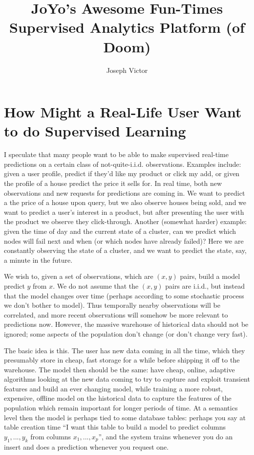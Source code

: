 \documentclass[a4paper,12pt]{article}
\author{Joseph Victor}
\title{JoYo's Awesome Fun-Times Supervised Analytics Platform (of Doom)}
\begin{document}
\maketitle

\section*{How Might a Real-Life User Want to do Supervised Learning}

I speculate that many people want to be able to make supervised real-time predictions on a certain class of not-quite-i.i.d. observations.  
Examples include: given a user profile, predict if they'd like my product or click my add, or given the profile of a house predict the price it sells for.
In real time, both new observations and new requests for predictions are coming in.
We want to predict a the price of a house upon query, but we also observe houses being sold, and we want to predict a user's interest in a product, but after presenting the user with the product we observe they click-through.
Another (somewhat harder) example: given the time of day and the current state of a cluster, can we predict which nodes will fail next and when (or which nodes have already failed)?
Here we are constantly observing the state of a cluster, and we want to predict the state, say, a minute in the future.  

We wish to, given a set of observations, which are  $(x,y)$ pairs, build a model predict $y$ from $x$.
We do not assume that the $(x,y)$ pairs are i.i.d., but instead that the model changes over time (perhaps according to some stochastic process we don't bother to model).  
Thus temporally nearby observations will be correlated, and more recent observations will somehow be more relevant to predictions now.
However, the massive warehouse of historical data should not be ignored; some aspects of the population don't change (or don't change very fast).

The basic idea is this.  
The user has new data coming in all the time, which they presumably store in cheap, fast storage for a while before shipping it off to the warehouse.
The model then should be the same: have cheap, online, adaptive algorithms looking at the new data coming to try to capture and exploit transient features and build an ever changing model, while training a more robust, expensive, offline model on the historical data to capture the features of the population which remain important for longer periods of time.  
At a semantics level then the model is perhaps tied to some database tables: perhaps you say at table creation time ``I want this table to build a model to predict columns $y_1,...,y_k$ from columns $x_1,...,x_p$'', and the system trains whenever you do an insert and does a prediction whenever you request one.
\end{document}
